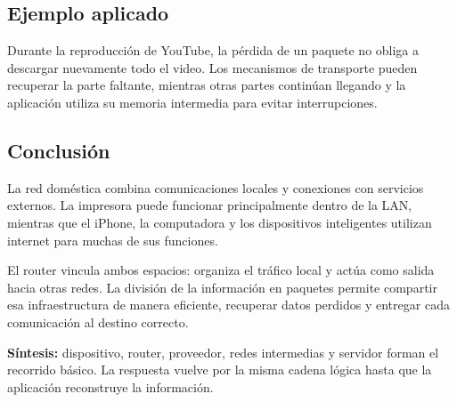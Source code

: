 \documentclass[11pt,a4paper]{article}
\newcommand{\infobox}[1]{%
  \noindent\colorbox{fondo}{\parbox{\dimexpr\textwidth-2\fboxsep}{#1}}}
\begin{document}
\subsection*{Ejemplo aplicado}

Durante la reproducción de YouTube, la pérdida de un paquete no obliga a descargar nuevamente todo el video. Los mecanismos de transporte pueden recuperar la parte faltante, mientras otras partes continúan llegando y la aplicación utiliza su memoria intermedia para evitar interrupciones.

\subsection*{Conclusión}

La red doméstica combina comunicaciones locales y conexiones con servicios externos. La impresora puede funcionar principalmente dentro de la LAN, mientras que el iPhone, la computadora y los dispositivos inteligentes utilizan internet para muchas de sus funciones.

El router vincula ambos espacios: organiza el tráfico local y actúa como salida hacia otras redes. La división de la información en paquetes permite compartir esa infraestructura de manera eficiente, recuperar datos perdidos y entregar cada comunicación al destino correcto.

\infobox{\textcolor{azul}{\textbf{Síntesis:}} dispositivo, router, proveedor, redes intermedias y servidor forman el recorrido básico. La respuesta vuelve por la misma cadena lógica hasta que la aplicación reconstruye la información.}
\end{document}
